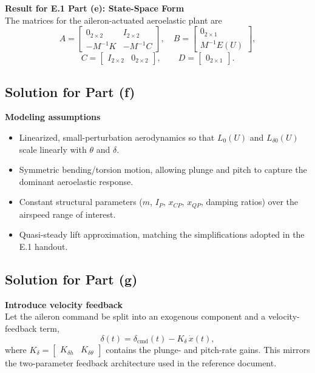 \documentclass[12pt]{article}
\begin{document}
\begin{resultsbox}
\textbf{Result for E.1 Part (e): State-Space Form}\\[0.5em]
The matrices for the aileron-actuated aeroelastic plant are
\[
  A = \begin{bmatrix}
        0_{2\times 2} & I_{2\times 2} \\
        -M^{-1}K & -M^{-1}C
      \end{bmatrix}, \quad
  B = \begin{bmatrix}
        0_{2\times 1} \\
        M^{-1}E(U)
      \end{bmatrix},
\]
\[
  C = \begin{bmatrix} I_{2\times 2} & 0_{2\times 2} \end{bmatrix}, \qquad
  D = \begin{bmatrix} 0_{2\times 1} \end{bmatrix}.
\]
\end{resultsbox}

\subsection*{Solution for Part (f)}

\begin{stepbox}
\textbf{Modeling assumptions}\\[0.5em]
\begin{itemize}
  \item Linearized, small-perturbation aerodynamics so that $L_0(U)$ and $L_{\delta 0}(U)$ scale linearly with $\theta$ and $\delta$.
  \item Symmetric bending/torsion motion, allowing plunge and pitch to capture the dominant aeroelastic response.
  \item Constant structural parameters ($m$, $I_P$, $x_{CP}$, $x_{QP}$, damping ratios) over the airspeed range of interest.
  \item Quasi-steady lift approximation, matching the simplifications adopted in the E.1 handout.
\end{itemize}
\end{stepbox}

\subsection*{Solution for Part (g)}

\begin{stepbox}
\textbf{Introduce velocity feedback}\\[0.5em]
Let the aileron command be split into an exogenous component and a velocity-feedback term,
\[
  \delta(t) = \delta_{\text{cmd}}(t) - K_\delta\,\dot{x}(t),
\]
where $K_\delta = \begin{bmatrix} K_{\delta h} & K_{\delta \theta} \end{bmatrix}$ contains the plunge- and pitch-rate gains.  This mirrors the two-parameter feedback architecture used in the reference document.
\end{stepbox}
\end{document}
